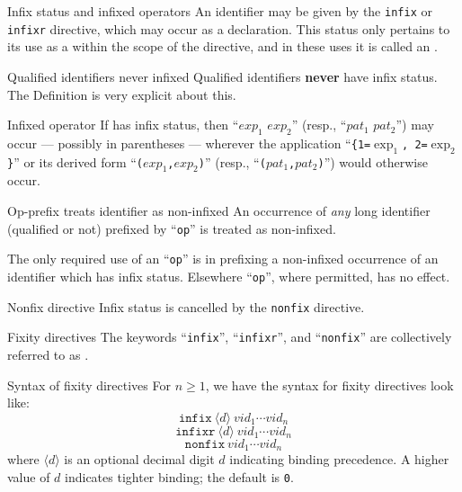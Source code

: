 \begin{definition}{Infix status and infixed operators}
An identifier may be given  by the \texttt{infix}
or \texttt{infixr} directive, which may occur as a declaration.
This status only pertains to its use as a \nonterminal{\vid} within the scope of the
directive, and in these uses it is called an .
\end{definition}

\begin{clause}{Qualified identifiers never infixed}
Qualified identifiers \textbf{never} have infix status. The
Definition is very explicit about this.
\end{clause}

\begin{example}{Infixed operator}
If \nonterminal{\vid} has infix status, then ``$exp_{1}$
\nonterminal{\vid} $exp_{2}$'' (resp., 
``$pat_{1}$ \nonterminal{\vid} $pat_{2}$'') may occur --- possibly in parentheses ---
wherever the application ``\nonterminal{\vid}\verb+{+{\tt 1=}$\exp_{1}$\verb+,+{\tt
2=}$\exp_{2}$\verb+}+'' or its derived form ``\nonterminal{\vid}\verb+(+$exp_{1}$\verb+,+$exp_{2}$\verb+)+'' (resp.,
``\nonterminal{\vid}\verb+(+$pat_{1}$\verb+,+$pat_{2}$\verb+)+'') would otherwise
occur.
\end{example}

\begin{clause}{Op-prefix treats identifier as non-infixed}
An occurrence of \emph{any} long identifier (qualified or not) prefixed
by ``\texttt{op}'' is treated as non-infixed.

The only required use of an ``\texttt{op}'' is in prefixing a
non-infixed occurrence of an identifier \nonterminal{\vid} which has infix
status. Elsewhere ``\texttt{op}'', where permitted, has no effect.
\end{clause}

\begin{definition}{Nonfix directive}
Infix status is cancelled by the \texttt{nonfix} directive.
\end{definition}

\begin{definition}{Fixity directives}
The keywords ``\texttt{infix}'', ``\texttt{infixr}'', and ``\texttt{nonfix}''
are collectively referred to as .
\end{definition}

\begin{clause}{Syntax of fixity directives}
For $n\geq1$, we have the syntax for fixity directives look like:
\[\mathtt{infix}~\langle d\rangle~vid_{1}\cdots vid_{n}\]
\[\mathtt{infixr}~\langle d\rangle~vid_{1}\cdots vid_{n}\]
\[\mathtt{nonfix}~vid_{1}\cdots vid_{n}\]
where $\langle d\rangle$ is an optional decimal digit $d$ indicating
binding precedence. A higher value of $d$ indicates tighter binding; the
default is \texttt{0}.
\end{clause}

